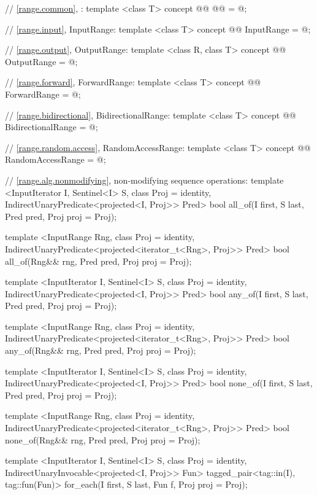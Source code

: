 {\begin{codeblock}
{{    // \ref{range.common}, :
    template <class T>
    concept @@ @@ = @\seebelow@;

    // \ref{range.input}, InputRange:
    template <class T>
    concept @@ InputRange = @\seebelow@;

    // \ref{range.output}, OutputRange:
    template <class R, class T>
    concept @@ OutputRange = @\seebelow@;

    // \ref{range.forward}, ForwardRange:
    template <class T>
    concept @@ ForwardRange = @\seebelow@;

    // \ref{range.bidirectional}, BidirectionalRange:
    template <class T>
    concept @@ BidirectionalRange = @\seebelow@;

    // \ref{range.random.access}, RandomAccessRange:
    template <class T>
    concept @@ RandomAccessRange = @\seebelow@;

    // \ref{range.alg.nonmodifying}, non-modifying sequence operations:
    template <InputIterator I, Sentinel<I> S, class Proj = identity,
        IndirectUnaryPredicate<projected<I, Proj>> Pred>
      bool all_of(I first, S last, Pred pred, Proj proj = Proj{});

    template <InputRange Rng, class Proj = identity,
        IndirectUnaryPredicate<projected<iterator_t<Rng>, Proj>> Pred>
      bool all_of(Rng&& rng, Pred pred, Proj proj = Proj{});

    template <InputIterator I, Sentinel<I> S, class Proj = identity,
        IndirectUnaryPredicate<projected<I, Proj>> Pred>
      bool any_of(I first, S last, Pred pred, Proj proj = Proj{});

    template <InputRange Rng, class Proj = identity,
        IndirectUnaryPredicate<projected<iterator_t<Rng>, Proj>> Pred>
      bool any_of(Rng&& rng, Pred pred, Proj proj = Proj{});

    template <InputIterator I, Sentinel<I> S, class Proj = identity,
        IndirectUnaryPredicate<projected<I, Proj>> Pred>
      bool none_of(I first, S last, Pred pred, Proj proj = Proj{});

    template <InputRange Rng, class Proj = identity,
        IndirectUnaryPredicate<projected<iterator_t<Rng>, Proj>> Pred>
      bool none_of(Rng&& rng, Pred pred, Proj proj = Proj{});

    template <InputIterator I, Sentinel<I> S, class Proj = identity,
        IndirectUnaryInvocable<projected<I, Proj>> Fun>
      tagged_pair<tag::in(I), tag::fun(Fun)>
        for_each(I first, S last, Fun f, Proj proj = Proj{});

}}
\end{codeblock}}
